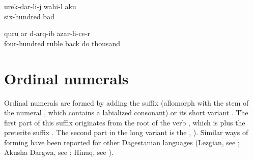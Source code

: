%
\ea\label{ex:tobuyflourfor600}
\gll	urek-dar\pafr-li-j wahi-l ak\lmk u\\
	six-hundred bad \\
\glt	{}
\z

\ea\label{ex:fromthe1000rubles}
 q\lmk uru{\pafr} \paaf ar d-arq\ej-ib azar-li-c\lmk e-r\\
	four-hundred ruble back do thousand\\
\glt	{}
\z




\section{Ordinal numerals}
\label{sec:ordinalnumerals}

Ordinal numerals are formed by adding the suffix  (allomorph  with the stem of the numeral , which contains a labialized consonant) or its short variant . The first part of this suffix originates from the root of the verb , which is \tit{-\glpl-} plus the preterite suffix . The second part  in the long variant is the  , ). Similar ways of forming  have been reported for other Dagestanian languages (\teg Lezgian, see \citealp[233]{Haspelmath1993}; Akusha Dargwa, see \citealp[30 fn.10]{vandenBerg2001}; Hinuq, see \citealp[401]{Forker2013a}).

